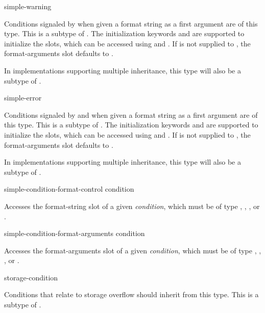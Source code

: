 \begin{defun}[Type]
simple-warning

  Conditions signaled by  when given a format string as a first
  argument are of this type. This is a subtype of .
  The initialization keywords  and  are supported
  to initialize the slots, which can be accessed using
   and .
  If  is not supplied to , the 
  format-arguments slot defaults to .

  In implementations supporting multiple inheritance, this type will also be
  a subtype of .
\end{defun}

\begin{defun}[Type]
simple-error

  Conditions signaled by  and  when given a format string 
  as a first argument are of this type. This is a subtype of .
  The initialization keywords  and  are supported
  to initialize the slots, which can be accessed using
   and .
  If  is not supplied to , the 
  format-arguments slot defaults to .

  In implementations supporting multiple inheritance, this type will also be
  a subtype of .
\end{defun}

\begin{defun}[Function]
simple-condition-format-control condition

  Accesses the format-string slot of a given \emph{condition}, which must be
  of type , , , or 
  .
\end{defun}

\begin{defun}[Function]
simple-condition-format-arguments condition

  Accesses the format-arguments slot of a given \emph{condition}, which must
  be of type , , , or
  .
\end{defun}


\begin{defun}[Type]
storage-condition

  Conditions that relate to storage overflow should inherit from this type.
  This is a subtype of .
\end{defun}


